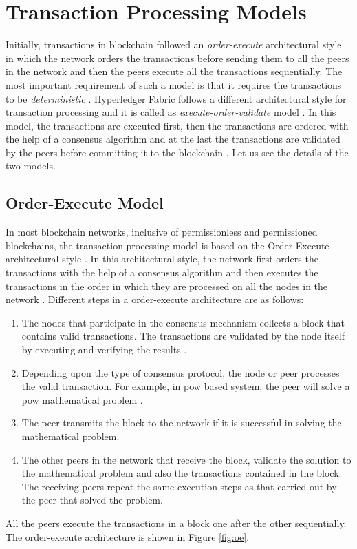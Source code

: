 \documentclass[
  a4paper,  %
  twoside,  %
  bibliography=totoc,
  headsepline,
  cleardoublepage=empty,
  parskip=half,
  draft=false
]{scrbook}
\begin{document}
\section{Transaction Processing Models}
Initially, transactions in blockchain followed an \textit{order-execute} architectural style in which the network orders the transactions before sending them to all the peers in the network and then the peers execute all the transactions sequentially. The most important requirement of such a model is that it requires the transactions to be \textit{deterministic} \cite{HF}. Hyperledger Fabric follows a different architectural style for transaction processing and it is called as \textit{execute-order-validate} model \cite{HF}. In this model, the transactions are executed first, then the transactions are ordered with the help of a consensus algorithm and at the last the transactions are validated by the peers before committing it to the blockchain \cite{HF}. Let us see the details of the two models.

\subsection{Order-Execute Model}
In most blockchain networks, inclusive of permissionless and permissioned blockchains, the transaction processing model is based on the Order-Execute architectural style \cite{HF}. In this architectural style, the network first orders the transactions with the help of a consensus algorithm and then executes the transactions in the order in which they are processed on all the nodes in the network \cite{HF}. Different steps in a order-execute architecture are as follows:
\begin{enumerate}
    \item The nodes that participate in the consensus mechanism collects a block that contains valid transactions. The transactions are validated by the node itself by executing and verifying the results \cite{HF}.
    \item Depending upon the type of consensus protocol, the node or peer processes the valid transaction. For example, in \gls{pow} based system, the peer will solve a \gls{pow} mathematical problem \cite{HF}.
    \item The peer transmits the block to the network if it is successful in solving the mathematical problem.
    \item The other peers in the network that receive the block, validate the solution to the mathematical problem and also the transactions contained in the block. The receiving peers repeat the same execution steps as that carried out by the peer that solved the problem.
\end{enumerate}
All the peers execute the transactions in a block one after the other sequentially. The order-execute architecture is shown in Figure \ref{fig:oe}.
\end{document}
